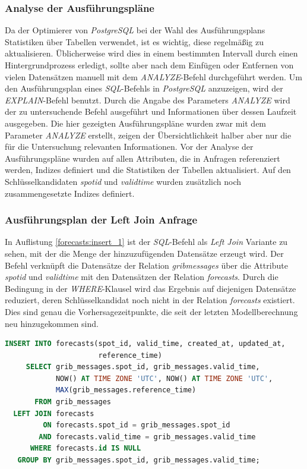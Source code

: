 \subsubsection{Analyse der Ausführungspläne}
Da der Optimierer von \textit{PostgreSQL} bei der Wahl des
Ausführungsplans Statistiken über Tabellen verwendet, ist es wichtig,
diese regelmäßig zu aktualisieren. Üblicherweise wird dies in einem
bestimmten Intervall durch einen Hintergrundprozess erledigt, sollte
aber nach dem Einfügen oder Entfernen von vielen Datensätzen manuell
mit dem \textit{ANALYZE}-Befehl durchgeführt werden. Um den
Ausführungsplan eines \textit{SQL}-Befehls in \textit{PostgreSQL}
anzuzeigen, wird der \textit{EXPLAIN}-Befehl benutzt. Durch die Angabe
des Parameters \textit{ANALYZE} wird der zu untersuchende Befehl
ausgeführt und Informationen über dessen Laufzeit ausgegeben. Die hier
gezeigten Ausführungspläne wurden zwar mit dem Parameter
\textit{ANALYZE} erstellt, zeigen der Übersichtlichkeit halber aber
nur die für die Untersuchung relevanten Informationen. Vor der Analyse
der Ausführungspläne wurden auf allen Attributen, die in Anfragen
referenziert werden, Indizes definiert und die Statistiken der
Tabellen aktualisiert. Auf den Schlüsselkandidaten
\textit{spot\textunderscore id} und \textit{valid\textunderscore time}
wurden zusätzlich noch zusammengesetzte Indizes definiert.

\subsubsection{Ausführungsplan der Left Join Anfrage}
In Auflistung \ref{forecasts:insert_1} ist der \textit{SQL}-Befehl als
\textit{Left Join} Variante zu sehen, mit der die Menge der
hinzuzufügenden Datensätze erzeugt wird. Der Befehl verknüpft die
Datensätze der Relation \textit{grib\textunderscore messages} über die
Attribute \textit{spot\textunderscore id} und
\textit{valid\textunderscore time} mit den Datensätzen der Relation
\textit{forecasts}. Durch die Bedingung in der \textit{WHERE}-Klausel
wird das Ergebnis auf diejenigen Datensätze reduziert, deren
Schlüsselkandidat noch nicht in der Relation \textit{forecasts}
existiert. Dies sind genau die Vorhersagezeitpunkte, die seit der
letzten Modellberechnung neu hinzugekommen sind.

\begin{lstlisting}[captionpos=b, caption=Hinzufügen von Datensätze mittels \textit{Left Join}, label=forecasts:insert_1, language=SQL]
INSERT INTO forecasts(spot_id, valid_time, created_at, updated_at, 
                      reference_time)
     SELECT grib_messages.spot_id, grib_messages.valid_time, 
            NOW() AT TIME ZONE 'UTC', NOW() AT TIME ZONE 'UTC', 
            MAX(grib_messages.reference_time)
       FROM grib_messages
  LEFT JOIN forecasts
         ON forecasts.spot_id = grib_messages.spot_id
        AND forecasts.valid_time = grib_messages.valid_time
      WHERE forecasts.id IS NULL
   GROUP BY grib_messages.spot_id, grib_messages.valid_time;
\end{lstlisting}

